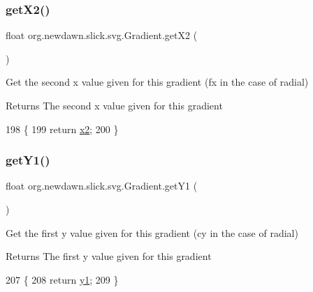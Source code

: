 \subsubsection{\texorpdfstring{get\+X2()}{getX2()}}
{\footnotesize\ttfamily float org.\+newdawn.\+slick.\+svg.\+Gradient.\+get\+X2 (\begin{DoxyParamCaption}{ }\end{DoxyParamCaption})\hspace{0.3cm}{\ttfamily [inline]}}

Get the second x value given for this gradient (fx in the case of radial)

\begin{DoxyReturn}{Returns}
The second x value given for this gradient 
\end{DoxyReturn}

\begin{DoxyCode}
198                          \{
199         \textcolor{keywordflow}{return} \mbox{\hyperlink{classorg_1_1newdawn_1_1slick_1_1svg_1_1_gradient_ab71f7951495ddd6c4394e05f038d7487}{x2}};
200     \}
\end{DoxyCode}
\mbox{\label{classorg_1_1newdawn_1_1slick_1_1svg_1_1_gradient_afd11c4ec7edd35d8426f2190dedd2c5b}} 
\subsubsection{\texorpdfstring{get\+Y1()}{getY1()}}
{\footnotesize\ttfamily float org.\+newdawn.\+slick.\+svg.\+Gradient.\+get\+Y1 (\begin{DoxyParamCaption}{ }\end{DoxyParamCaption})\hspace{0.3cm}{\ttfamily [inline]}}

Get the first y value given for this gradient (cy in the case of radial)

\begin{DoxyReturn}{Returns}
The first y value given for this gradient 
\end{DoxyReturn}

\begin{DoxyCode}
207                          \{
208         \textcolor{keywordflow}{return} \mbox{\hyperlink{classorg_1_1newdawn_1_1slick_1_1svg_1_1_gradient_a6dd1b7c9e7ab1e8e2ba41232cd933046}{y1}};
209     \}
\end{DoxyCode}
\mbox{\label{classorg_1_1newdawn_1_1slick_1_1svg_1_1_gradient_a532eb210328cc87375bc3fc28ff0cc8a}} 
